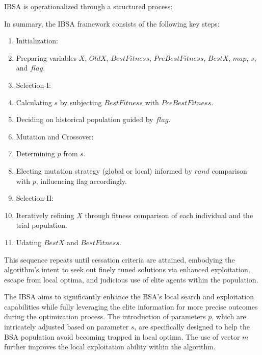 \documentclass{article} %
\begin{document}
IBSA is operationalized through a structured process:

In summary, the IBSA framework consists of the following key steps:

\begin{enumerate}
\item  Initialization:

\item  Preparing variables $X$, $OldX$, $BestFitness$, $PreBestFitness$, $BestX$, $map$, $s$, and $flag$.

\item  Selection-I:

\item  Calculating $s$ by subjecting $BestFitness$ with $PreBestFitness$.

\item  Deciding on historical population guided by $flag$.

\item  Mutation and Crossover:

\item  Determining $p$ from $s$.

\item  Electing mutation strategy (global or local) informed by $rand$ comparison with $p$, influencing flag accordingly.

\item  Selection-II:

\item  Iteratively refining $X$ through fitness comparison of each individual and the trial population.

\item  Udating $BestX$ and $BestFitness$.
\end{enumerate}

This sequence repeats until cessation criteria are attained, embodying the algorithm's intent to seek out finely tuned solutions via enhanced exploitation, escape from local optima, and judicious use of elite agents within the population.

The IBSA aims to significantly enhance the BSA's local search and exploitation capabilities while fully leveraging the elite information for more precise outcomes during the optimization process. The introduction of parameters $p$, which are intricately adjusted based on parameter $s$, are specifically designed to help the BSA population avoid becoming trapped in local optima. The use of vector $m$ further improves the local exploitation ability within the algorithm.
\end{document}

